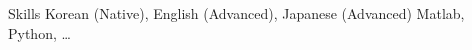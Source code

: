 
\begin{rubric}{Skills}
\entry*[Languages]
	Korean (Native), English (Advanced), Japanese (Advanced)
	Matlab, Python, \ldots
\end{rubric}
